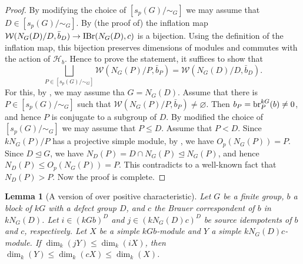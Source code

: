 \documentclass[preprint,12pt,3p]{elsarticle}
\newtheorem{lemma}[theorem]{Lemma}
\def\IBr{{\rm IBr}}
\def\br{{\rm br}}
\def\W{\mathcal{W}}
\def\H{\mathcal{H}}
\begin{document}
\begin{proof}
By modifying the choice of $[s_p(G)/\sim_G]$ we may assume that $D\in [s_p(G)/\sim_G]$. By (the proof of) \cite[Consequence 1]{Alp} the inflation map $\W(N_G(D)/D,\bar{b}_D)\to \IBr(N_G(D),c)$ is a bijection. Using the definition of the inflation map, this bijection preserves dimensions of modules and commutes with the action of $\H_b$.
Hence to prove the statement, it suffices to show that 
$$\bigsqcup_{P\in [s_p(G)/\sim_G]}\W(N_G(P)/P,\bar{b}_P)=\W(N_G(D)/D,\bar{b}_D).$$
For this, by \cite[Corollary 1.3]{H25}, we may assume tha $G=N_G(D)$. Assume that there is $P\in [s_p(G)/\sim_G]$ such that $\W(N_G(P)/P,\bar{b}_P)\neq\varnothing$. Then $b_P=\br_P^{kG}(b)\neq 0$, and hence $P$ is conjugate to a subgroup of $D$. By modified the choice of $[s_p(G)/\sim_G]$ we may assume that $P\leq D$. Assume that $P<D$. Since $kN_G(P)/P$ has a projective simple module, by \cite[Proposition 1.15.14]{Lin18a}, we have $O_p(N_G(P))=P$. Since $D\unlhd G$, we have $N_D(P)=D\cap N_G(P)\unlhd N_G(P)$, and hence $N_D(P)\leq O_p(N_G(P))=P$. This contradicts to a well-known fact that $N_D(P)>P$. Now the proof is complete.
\end{proof}

\begin{lemma}[A version of {\cite[Lemma 3.2]{Lin25}} over positive characteristic]\label{lemma:inequality and source algebra}
Let $G$ be a finite group, $b$ a block of $kG$ with a defect group $D$, and $c$ the Brauer correspondent of $b$ in $kN_G(D)$. Let $i\in (kGb)^D$ and $j\in (kN_G(D)c)^D$ be source idempotents of $b$ and $c$, respectively. Let $X$ be a simple $kGb$-module and $Y$ a simple $kN_G(D)c$-module. If $\dim_k(jY)\leq \dim_k(iX)$, then $\dim_k(Y)\leq \dim_k(cX)\leq \dim_k(X)$.
\end{lemma}
\end{document}
